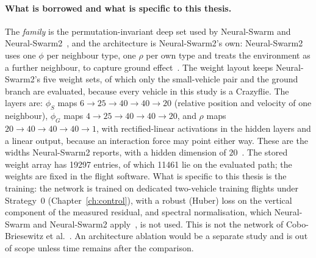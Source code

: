 \paragraph{What is borrowed and what is specific to this thesis.} The \emph{family} is the permutation-invariant deep
set used by Neural-Swarm and Neural-Swarm2~\cite{shi2020neuralswarm,shi2022neuralswarm2}, and the
architecture is Neural-Swarm2's own: Neural-Swarm2 uses one $\phi$ per neighbour type, one $\rho$
per own type and treats the environment as a further neighbour, to capture ground
effect~\cite{shi2022neuralswarm2}. The weight layout keeps Neural-Swarm2's five weight sets, of
which only the small-vehicle pair and the ground branch are evaluated, because every vehicle in this
study is a Crazyflie. The layers are:
$\phi_S$ maps $6 \rightarrow 25 \rightarrow 40 \rightarrow 40 \rightarrow 20$ (relative position and
velocity of one neighbour), $\phi_G$ maps $4 \rightarrow 25 \rightarrow 40 \rightarrow 40
\rightarrow 20$, and $\rho$ maps $20 \rightarrow 40 \rightarrow 40 \rightarrow 40 \rightarrow 1$,
with rectified-linear activations in the hidden layers and a linear output, because an interaction
force may point either way. These are the widths Neural-Swarm2 reports, with a hidden dimension of
$20$~\cite{shi2022neuralswarm2}. The stored weight array has \num{19297} entries, of which \num{11461}
lie on the evaluated path; the weights are fixed in the flight software. What is specific to this
thesis is the training: the network is trained on dedicated two-vehicle training flights under Strategy~0
(Chapter~\ref{ch:control}), with a robust (Huber) loss on the
vertical component of the measured residual, and spectral normalisation, which Neural-Swarm and
Neural-Swarm2 apply~\cite{shi2020neuralswarm,shi2022neuralswarm2}, is not used. This is not the
network of Cobo-Briesewitz et al.~\cite{cobobriesewitz2026lindi}. An architecture ablation would be
a separate study and is out of scope unless time remains after the comparison.

